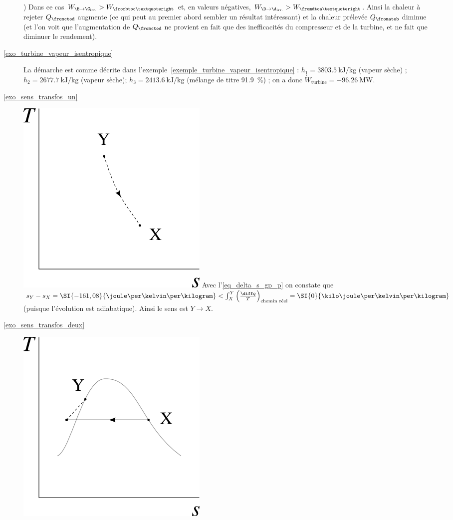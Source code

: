 \begin{description}
						) Dans ce cas $W_{\B\to\C_\text{irr.}} > W_{\frombtoc’}$ et, en valeurs négatives, $W_{\D\to\A_\text{irr.}} > W_{\fromdtoa’}$. Ainsi la chaleur à rejeter $Q_{\fromctod}$ augmente (ce qui peut au premier abord sembler un résultat intéressant) et la chaleur prélevée $Q_{\fromatob}$ diminue (et l’on voit que l’augmentation de $Q_{\fromctod}$ ne provient en fait que des inefficacités du compresseur et de la turbine, et ne fait que diminuer le rendement).
		\item [\ref{exo_turbine_vapeur_isentropique}]
						\tab La démarche est comme décrite dans l’exemple~\ref{exemple_turbine_vapeur_isentropique} : $h_1 = \SI{3803,5}{\kilo\joule\per\kilogram}$ (vapeur sèche) ; $h_2 = \SI{2677,7}{\kilo\joule\per\kilogram}$ (vapeur sèche); $h_3 = \SI{2413,6}{\kilo\joule\per\kilogram}$ (mélange de titre \SI{91,9}{\percent}) ; on a donc $\dot{W}_\text{turbine} = \SI{-96,26}{\mega\watt}$.
		\item [\ref{exo_sens_transfos_un}]
						\includegraphics[width=\solutiondiagramwidth]{images/exo_sol_ts_bonsens1.png}
						\tab\tab Avec l’\cref{eq_delta_s_gp_p} on constate que $s_Y - s_X = \SI{-161,08}{\joule\per\kelvin\per\kilogram} < \int_X^Y \left(\frac{\diff q}{T}\right)_\text{chemin réel} = \SI{0}{\kilo\joule\per\kelvin\per\kilogram}$ (puisque l’évolution est adiabatique). Ainsi le sens est $Y\to X$.
		\item [\ref{exo_sens_transfos_deux}]
						\includegraphics[width=\solutiondiagramwidth]{images/exo_sol_ts_bonsens2.png}

\end{description}
